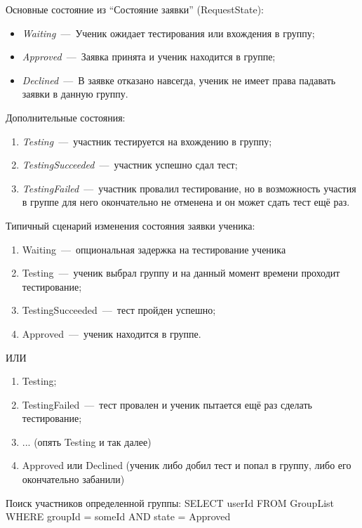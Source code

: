 \documentclass[14pt]{article}
\begin{document}
Основные состояние из ``Состояние заявки'' (RequestState):

\begin{itemize}
	\item \emph{Waiting}~---~Ученик ожидает тестирования или вхождения в группу;
	\item \emph{Approved}~---~Заявка принята и ученик находится в группе;
	\item \emph{Declined}~---~В заявке отказано навсегда, ученик не имеет права падавать заявки в данную группу.
\end{itemize}

Дополнительные состояния:
\begin{enumerate}
	\item \emph{Testing}~---~участник тестируется на вхождению в группу;
	\item \emph{TestingSucceeded}~---~участник успешно сдал тест;
	\item \emph{TestingFailed}~---~участник провалил тестирование, но в возможность участия в группе для него окончательно не отменена и он может сдать тест ещё раз.
\end{enumerate}

Типичный сценарий изменения состояния заявки ученика:

\begin{enumerate}
	\item Waiting~---~опциональная задержка на тестирование ученика
	\item Testing~---~ученик выбрал группу и на данный момент времени проходит тестирование;
	\item TestingSucceeded~---~тест пройден успешно;
	\item Approved~---~ученик находится в группе.
\end{enumerate}

ИЛИ

\begin{enumerate}
	\item Testing;
	\item TestingFailed~---~тест провален и ученик пытается ещё раз сделать тестирование;
	\item ... (опять Testing и так далее)
	\item Approved или Declined (ученик либо добил тест и попал в группу, либо его окончательно забанили)
\end{enumerate}

Поиск участников определенной группы: SELECT userId FROM GroupList WHERE groupId = someId AND state = Approved
\end{document}
